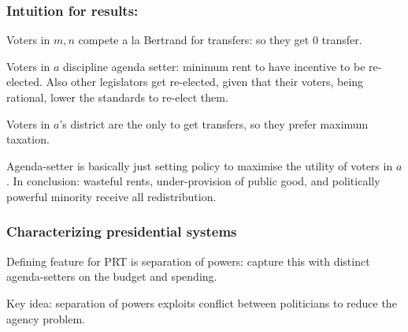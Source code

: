 \documentclass[11pt,aspectratio=169]{beamer}
\begin{document}
\begin{frame}
\frametitle{Intuition for results:}
\noindent Voters in $m, n$ compete a la Bertrand for transfers: so they get 0 transfer.

\medskip

\noindent Voters in $a$ discipline agenda setter: minimum rent to have incentive to be re-elected. Also other legislators get re-elected, given that their voters, being rational, lower the standards to re-elect them.

\medskip

\noindent  Voters in $a$'s district are the only to get transfers, so they prefer maximum taxation. %

\medskip

\noindent Agenda-setter is basically just setting policy to maximise the utility of voters in $a$. In conclusion: wasteful rents, under-provision of public good, and politically powerful minority receive all redistribution.  
\end{frame}


\begin{frame}
\frametitle{Characterizing presidential systems}

\noindent Defining feature for PRT is separation of powers: capture this with distinct agenda-setters on the budget and spending. 

\bigskip

\noindent Key idea: separation of powers exploits conflict between politicians to reduce the agency problem.

\end{frame}
\end{document}
